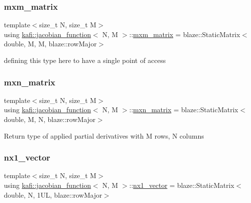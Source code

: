 \subsubsection{\texorpdfstring{mxm\+\_\+matrix}{mxm\_matrix}}
{\footnotesize\ttfamily template$<$size\+\_\+t N, size\+\_\+t M$>$ \\
using \hyperlink{classkafi_1_1jacobian__function}{kafi\+::jacobian\+\_\+function}$<$ N, M $>$\+::\hyperlink{classkafi_1_1jacobian__function_a3cfd8181614c2795ae040118ff143a8e}{mxm\+\_\+matrix} =  blaze\+::\+Static\+Matrix$<$double, M, M, blaze\+::row\+Major$>$}

defining this type here to have a single point of access \mbox{\label{classkafi_1_1jacobian__function_afdc859dfbc351b172814b235b577413f}} 
\subsubsection{\texorpdfstring{mxn\+\_\+matrix}{mxn\_matrix}}
{\footnotesize\ttfamily template$<$size\+\_\+t N, size\+\_\+t M$>$ \\
using \hyperlink{classkafi_1_1jacobian__function}{kafi\+::jacobian\+\_\+function}$<$ N, M $>$\+::\hyperlink{classkafi_1_1jacobian__function_afdc859dfbc351b172814b235b577413f}{mxn\+\_\+matrix} =  blaze\+::\+Static\+Matrix$<$double, M, N, blaze\+::row\+Major$>$}

Return type of applied partial derivatives with {\ttfamily M} rows, {\ttfamily N} columns \mbox{\label{classkafi_1_1jacobian__function_ad7e7a8fbfa3e2785798bd46e5307ca65}} 
\subsubsection{\texorpdfstring{nx1\+\_\+vector}{nx1\_vector}}
{\footnotesize\ttfamily template$<$size\+\_\+t N, size\+\_\+t M$>$ \\
using \hyperlink{classkafi_1_1jacobian__function}{kafi\+::jacobian\+\_\+function}$<$ N, M $>$\+::\hyperlink{classkafi_1_1jacobian__function_ad7e7a8fbfa3e2785798bd46e5307ca65}{nx1\+\_\+vector} =  blaze\+::\+Static\+Matrix$<$double, N, 1\+U\+L, blaze\+::row\+Major$>$}

